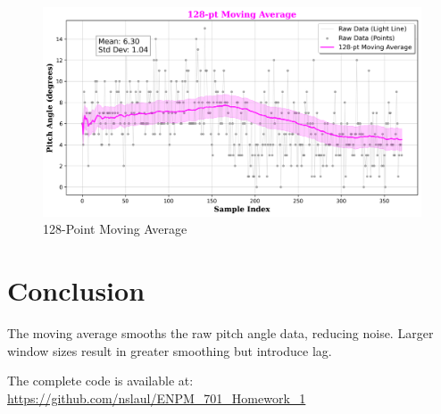\documentclass[a4paper,12pt]{article}
\begin{document}
\begin{figure}[H]
    \centering
    \includegraphics[width=1\textwidth]{pitch_analysis_128pt.png}
    \caption{128-Point Moving Average}
    \label{fig:128pt}
\end{figure}

\section*{Conclusion}
The moving average smooths the raw pitch angle data, reducing noise. Larger window sizes result in greater smoothing but introduce lag. 

The complete code is available at:  
\url{https://github.com/nslaul/ENPM_701_Homework_1}
\end{document}
